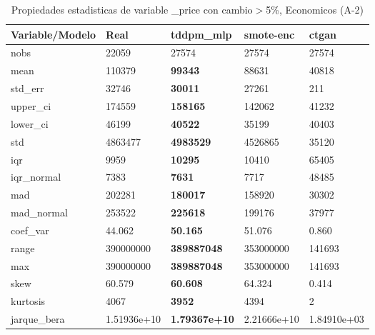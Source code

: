 \begin{table}[H]
\centering
\fontsize{8}{14}\selectfont
\caption{Propiedades estadisticas de variable \_price con cambio\ensuremath{>}5\%, Economicos (A-2)}
\label{table-stats-economicos-a-2-_price-short}
\begin{tabular}{|l|m{10em}|m{10em}|m{10em}|m{10em}|}
\hline
 \rowcolor[gray]{0.8}
Variable/Modelo & Real & tddpm\_mlp & smote-enc & ctgan \\
\hline nobs & 22059 & 27574 & 27574 & 27574 \\
\hline mean & 110379 & \bfseries 99343 & 88631 & \cellcolor[rgb]{0.9, 0.54, 0.52} 40818 \\
\hline std\_err & 32746 & \bfseries 30011 & 27261 & \cellcolor[rgb]{0.9, 0.54, 0.52} 211 \\
\hline upper\_ci & 174559 & \bfseries 158165 & 142062 & \cellcolor[rgb]{0.9, 0.54, 0.52} 41232 \\
\hline lower\_ci & 46199 & \bfseries 40522 & \cellcolor[rgb]{0.9, 0.54, 0.52} 35199 & 40403 \\
\hline std & 4863477 & \bfseries 4983529 & 4526865 & \cellcolor[rgb]{0.9, 0.54, 0.52} 35120 \\
\hline iqr & 9959 & \bfseries 10295 & 10410 & \cellcolor[rgb]{0.9, 0.54, 0.52} 65405 \\
\hline iqr\_normal & 7383 & \bfseries 7631 & 7717 & \cellcolor[rgb]{0.9, 0.54, 0.52} 48485 \\
\hline mad & 202281 & \bfseries 180017 & 158920 & \cellcolor[rgb]{0.9, 0.54, 0.52} 30302 \\
\hline mad\_normal & 253522 & \bfseries 225618 & 199176 & \cellcolor[rgb]{0.9, 0.54, 0.52} 37977 \\
\hline coef\_var & 44.062 & \bfseries 50.165 & 51.076 & \cellcolor[rgb]{0.9, 0.54, 0.52} 0.860 \\
\hline range & 390000000 & \bfseries 389887048 & 353000000 & \cellcolor[rgb]{0.9, 0.54, 0.52} 141693 \\
\hline max & 390000000 & \bfseries 389887048 & 353000000 & \cellcolor[rgb]{0.9, 0.54, 0.52} 141693 \\
\hline skew & 60.579 & \bfseries 60.608 & 64.324 & \cellcolor[rgb]{0.9, 0.54, 0.52} 0.414 \\
\hline kurtosis & 4067 & \bfseries 3952 & 4394 & \cellcolor[rgb]{0.9, 0.54, 0.52} 2 \\
\hline jarque\_bera & 1.51936e+10 & \bfseries 1.79367e+10 & 2.21666e+10 & \cellcolor[rgb]{0.9, 0.54, 0.52} 1.84910e+03 \\

\end{tabular}
\end{table}
